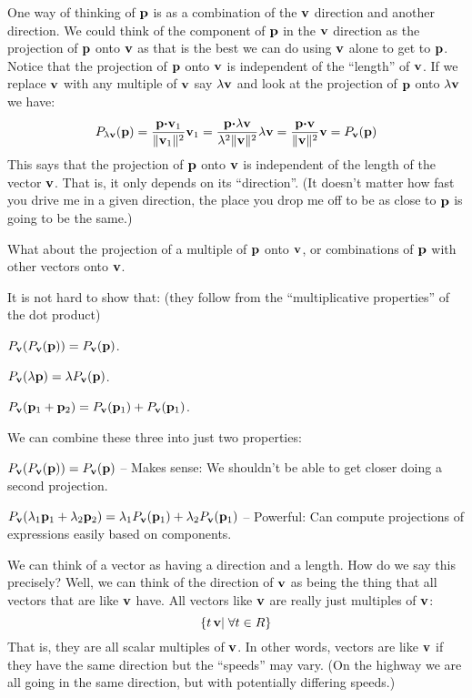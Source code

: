 \documentclass[12pt]{article}
\begin{document}
One way of thinking of ${\bf p}$ is as a combination of the ${\bf v}$ direction 
and another direction. We could think of the component of ${\bf p}$ in 
the ${\bf v}$ direction as 
the projection of ${\bf p}$ onto ${\bf v}$ as that is the best we can do 
using ${\bf v}$ alone to get to ${\bf p}$.
Notice that the projection of ${\bf p}$ onto ${\bf v}$ is independent of 
the ``length'' of ${\bf v}$.
If we replace ${\bf v}$ with any multiple of ${\bf v}$ say $\lambda {\bf v}$ 
and look at the projection of 
${\bf p}$ onto $\lambda {\bf v}$ we have:
$$ P_{\lambda {\bf v}}({\bf p}) = \frac{{\bf p} {\boldsymbol \cdot} {\bf v}_1}{\|{\bf v}_1\|^2} {\bf v}_1 = 
\frac{{\bf p} {\boldsymbol \cdot} \lambda {\bf v}}{\lambda^2 \|{\bf v}\|^2} \lambda {\bf v} 
= \frac{{\bf p} {\boldsymbol \cdot} {\bf v}}{\|{\bf v}\|^2} {\bf v} = P_{{\bf v}}({\bf p})$$
This says that the projection of ${\bf p}$ onto ${\bf v}$ is independent of 
the length of the vector ${\bf v}$. That is, it only depends on its ``direction''.
(It doesn't matter how fast you drive me in a given direction, the place 
you drop me off to be as close to ${\bf p}$ is going to be the same.)

What about the projection of a multiple of ${\bf p}$ onto ${\bf v}$, or 
combinations of ${\bf p}$ with other vectors onto ${\bf v}$.

It is not hard to show that: (they follow from the ``multiplicative properties''
of the dot product)
\bi
  \item{$P_{\bf v}(P_{\bf v}({\bf p})) = P_{\bf v}({\bf p})$.}
  \item{$P_{\bf v}(\lambda {\bf p}) = \lambda P_{\bf v}({\bf p})$.}
  \item{$P_{\bf v}({\bf p}_1 + {\bf p}_2) = P_{\bf v}({\bf p}_1) + P_{\bf v}({\bf p}_1)$.}
\ei

We can combine these three into just two properties:
\bi
  \item{ $P_{\bf v}(P_{\bf v}({\bf p})) = P_{\bf v}({\bf p})$ -- Makes sense: 
      We shouldn't be able to get closer doing a second projection.}
\item{ $P_{\bf v}(\lambda_1 {\bf p}_1 + \lambda_2 {\bf p}_2) = 
    \lambda_1 P_{\bf v}({\bf p}_1) + \lambda_2 P_{\bf v}({\bf p}_1)$ -- 
    Powerful: Can compute projections of expressions easily based on components. }
\ei

We can think of a vector as having a direction and a length. 
How do we say this precisely? Well, we can think of the direction 
of ${\bf v}$ as being the thing that all vectors that are like ${\bf v}$ have. 
All vectors like ${\bf v}$ are really just multiples of ${\bf v}$:
$$ \{ t \, {\bf v} | \; \forall t \in R\} $$
That is, they are all scalar multiples of ${\bf v}$. 
In other words, vectors are like ${\bf v}$ if they have the same direction 
but the ``speeds'' may vary.
(On the highway we are all going in the same direction, but with 
potentially differing speeds.)
\end{document}

